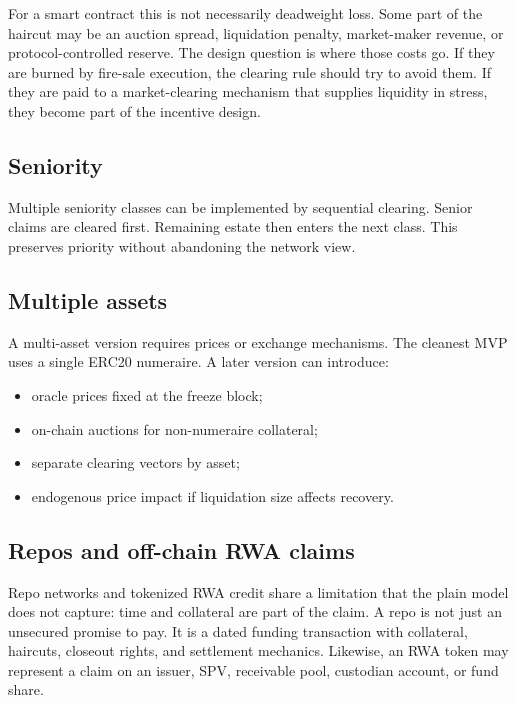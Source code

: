 \documentclass[11pt,oneside]{article}
\begin{document}
For a smart contract this is not necessarily deadweight loss. Some part of the
haircut may be an auction spread, liquidation penalty, market-maker revenue, or
protocol-controlled reserve. The design question is where those costs go. If
they are burned by fire-sale execution, the clearing rule should try to avoid
them. If they are paid to a market-clearing mechanism that supplies liquidity in
stress, they become part of the incentive design.

\subsection{Seniority}

Multiple seniority classes can be implemented by sequential clearing. Senior
claims are cleared first. Remaining estate then enters the next class. This
preserves priority without abandoning the network view.

\subsection{Multiple assets}

A multi-asset version requires prices or exchange mechanisms. The cleanest MVP
uses a single ERC20 numeraire. A later version can introduce:

\begin{itemize}[leftmargin=1.5em]
  \item oracle prices fixed at the freeze block;
  \item on-chain auctions for non-numeraire collateral;
  \item separate clearing vectors by asset;
  \item endogenous price impact if liquidation size affects recovery.
\end{itemize}

\subsection{Repos and off-chain RWA claims}

Repo networks and tokenized RWA credit share a limitation that the plain model
does not capture: time and collateral are part of the claim. A repo is not just
an unsecured promise to pay. It is a dated funding transaction with collateral,
haircuts, closeout rights, and settlement mechanics. Likewise, an RWA token may
represent a claim on an issuer, SPV, receivable pool, custodian account, or fund
share.
\end{document}
